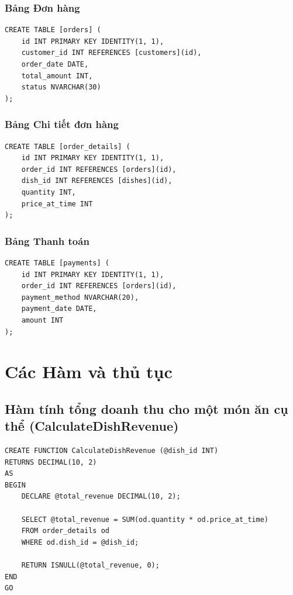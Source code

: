 \documentclass{article}
\begin{document}
\subsubsection{Bảng Đơn hàng}

\begin{verbatim}
CREATE TABLE [orders] (
    id INT PRIMARY KEY IDENTITY(1, 1),
    customer_id INT REFERENCES [customers](id),
    order_date DATE,
    total_amount INT,
    status NVARCHAR(30)
);
\end{verbatim}

\subsubsection{Bảng Chi tiết đơn hàng}

\begin{verbatim}
CREATE TABLE [order_details] (
    id INT PRIMARY KEY IDENTITY(1, 1),
    order_id INT REFERENCES [orders](id),
    dish_id INT REFERENCES [dishes](id),
    quantity INT,
    price_at_time INT
);
\end{verbatim}

\subsubsection{Bảng Thanh toán}

\begin{verbatim}
CREATE TABLE [payments] (
    id INT PRIMARY KEY IDENTITY(1, 1),
    order_id INT REFERENCES [orders](id),
    payment_method NVARCHAR(20),
    payment_date DATE,
    amount INT
);
\end{verbatim}

\section{Các Hàm và thủ tục}

\subsection{Hàm tính tổng doanh thu cho một món ăn cụ thể (CalculateDishRevenue)}

\begin{verbatim}
CREATE FUNCTION CalculateDishRevenue (@dish_id INT)
RETURNS DECIMAL(10, 2)
AS
BEGIN
    DECLARE @total_revenue DECIMAL(10, 2);

    SELECT @total_revenue = SUM(od.quantity * od.price_at_time)
    FROM order_details od
    WHERE od.dish_id = @dish_id;

    RETURN ISNULL(@total_revenue, 0);
END
GO
\end{verbatim}
\end{document}
